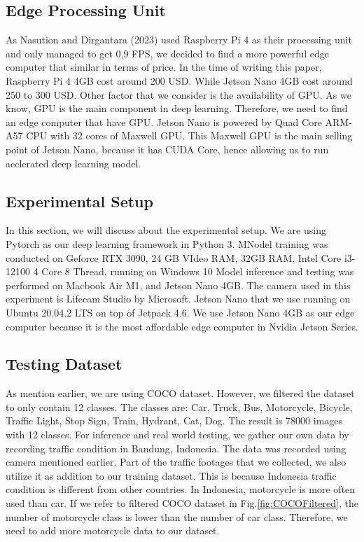 \documentclass[conference]{IEEEtran}
\begin{document}
\subsection{Edge Processing Unit}
As Nasution and Dirgantara (2023) used Raspberry Pi 4 as their processing unit and only managed to get 0,9 FPS, we decided to find a more powerful edge computer that similar in terms of price. In the time of writing this paper, Raspberry Pi 4 4GB cost around 200 USD. While Jetson Nano 4GB cost around 250 to 300 USD.
Other factor that we consider is the availability of GPU. As we know, GPU is the main component in deep learning. Therefore, we need to find an edge computer that have GPU.
Jetson Nano is powered by Quad Core ARM-A57 CPU with 32 cores of Maxwell GPU. This Maxwell GPU is the main selling point of Jetson Nano, because it has CUDA Core, hence allowing us to run acclerated deep learning model.

\subsection{Experimental Setup}
In this section, we will discuss about the experimental setup. We are using Pytorch as our deep learning framework in Python  3.
MNodel training was conducted on Geforce RTX 3090, 24 GB VIdeo RAM, 32GB RAM, Intel Core i3-12100 4 Core 8 Thread, running on Windows 10
Model inference and testing was performed on Macbook Air M1, and Jetson Nano 4GB. The camera used in this experiment is Lifecam Studio by Microsoft.
Jetson Nano that we use running on Ubuntu 20.04.2 LTS on top of Jetpack 4.6. We use Jetson Nano 4GB as our edge computer because it is the most affordable edge computer in Nvidia Jetson Series.
\subsection{Testing Dataset}
As mention earlier, we are using COCO dataset. However, we filtered the dataset to only contain 12 classes. The classes are:
Car, Truck, Bus, Motorcycle, Bicycle, Traffic Light, Stop Sign, Train, Hydrant, Cat, Dog. The result is 78000 images with 12 classes.
For inference and real world testing, we gather our own data by recording traffic condition in Bandung, Indonesia. The data was recorded using camera mentioned earlier.
Part of the traffic footages that we collected, we also utilize it as addition to our training dataset. This is because Indonesia traffic condition is different from other countries. In Indonesia, motorcycle is more often used than car.
If we refer to filtered COCO dataset in Fig.\ref{fig:COCOFiltered}, the number of motorcycle class is lower than the number of car class. Therefore, we need to add more motorcycle data to our dataset.
\end{document}
